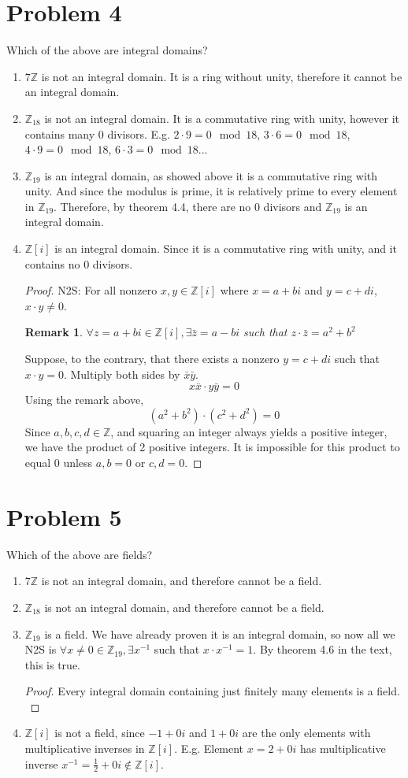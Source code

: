 \documentclass[12pt]{article}
\newtheorem*{remark}{Remark}
\newenvironment{customthm}[1]
  {\renewcommand\theinnercustomthm{#1}\innercustomthm}
  {\endinnercustomthm}
\newcommand{\Z}{\mathbb{Z}}
\begin{document}
\section{Problem 4}
Which of the above are integral domains?
\begin{enumerate}
    \item $7\Z$ is not an integral domain. It is a ring without unity, therefore it cannot be an integral domain.
    \item $\Z_{18}$ is not an integral domain. It is a commutative ring with unity, however it contains many 0 divisors. E.g. $2\cdot9=0\mod{18}$, $3\cdot6=0\mod{18}$, $4\cdot9=0\mod{18}$, $6\cdot3=0\mod{18}$...
    \item $\Z_{19}$ is an integral domain, as showed above it is a commutative ring with unity. And since the modulus is prime, it is relatively prime to every element in $\Z_{19}$. Therefore, by theorem 4.4, there are no 0 divisors and $\Z_{19}$ is an integral domain.
    \item $\Z[i]$ is an integral domain. Since it is a commutative ring with unity, and it contains no 0 divisors.
    \begin{proof}
    N2S:  For all nonzero $x,y\in\Z[i]$ where $x=a+bi$ and $y=c+di$, $x\cdot y\neq0$.
    \begin{remark}$\forall z=a+bi\in\Z[i],\exists \bar z=a-bi$ such that $z\cdot\bar z=a^2+b^2$ \end{remark}
    Suppose, to the contrary, that there exists a nonzero $y=c+di$ such that $x\cdot y=0$. Multiply both sides by $\bar x\bar y$. $$x\bar x\cdot y\bar y=0$$ Using the remark above,$$(a^2+b^2)\cdot(c^2+d^2)=0$$ Since $a,b,c,d\in\Z$, and squaring an integer always yields a positive integer, we have the product of 2 positive integers. It is impossible for this product to equal 0 unless $a,b=0$ or $c,d=0$. \scalebox{1.5}{\Lightning}
    \end{proof}
\end{enumerate}
\section{Problem 5}
Which of the above are fields?
\begin{enumerate}
    \item $7\Z$ is not an integral domain, and therefore cannot be a field.
    \item $\Z_{18}$ is not an integral domain, and therefore cannot be a field.
    \item $\Z_{19}$ is a field. We have already proven it is an integral domain, so now all we N2S is $\forall x\neq0\in\Z_{19},\exists x^{-1}$ such that $x\cdot x^{-1}=1$. By theorem 4.6 in the text, this is true. \begin{proof}\begin{customthm}{4.6}Every integral domain containing just finitely many elements is a field.
    \end{customthm} \end{proof}
    \item $\Z[i]$ is not a field, since $-1+0i$ and $1+0i$ are the only elements with multiplicative inverses in $\Z[i]$. E.g. Element $x=2+0i$ has multiplicative inverse $x^{-1}=\frac{1}{2}+0i\notin\Z[i]$.
\end{enumerate}
\end{document}
